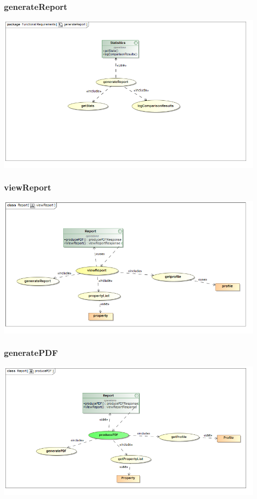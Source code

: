 \documentclass[a4paper,12pt]{article}
\begin{document}
\subsubsection{generateReport}
\includegraphics[width=1\textwidth]{./Images/requiredFunctionality/generateReport.png}
\subsubsection{viewReport}
\includegraphics[width=1\textwidth]{./Images/newDiagrams/requiredFunctionality/Sandile/viewReportFR.png}
\subsubsection{generatePDF}
\includegraphics[width=1\textwidth]{./Images/newDiagrams/requiredFunctionality/Sandile/producePDFFR.png}
\end{document}

